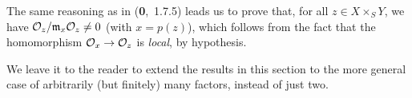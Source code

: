 The same reasoning as in (\textbf{0},~1.7.5) leads us to prove that, for all
$z\in X\times_S Y$, we have $\mathcal{O}_z/\mathfrak{m}_x\mathcal{O}_z\neq0$ (with $x=p(z)$),
which follows from the fact that the homomorphism $\mathcal{O}_x\to\mathcal{O}_z$ is \emph{local},
by hypothesis.

We leave it to the reader to extend the results in this section to the more
general case of arbitrarily (but finitely) many factors, instead of just two.

